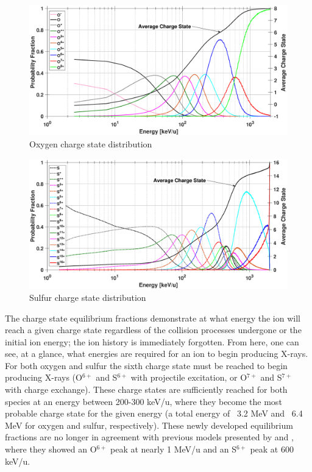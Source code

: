 \documentclass[draft]{agujournal2018}
\begin{document}
\begin{figure}[ht]
    \centering
    \includegraphics[width=\textwidth]{Figures/CSDoxy.eps}
    \caption{Oxygen charge state distribution}
    \label{fig:CSDoxy}
\end{figure}

\begin{figure}[ht]
    \centering
    \includegraphics[width=\textwidth]{Figures/CSDsul.eps}
    \caption{Sulfur charge state distribution}
    \label{fig:CSDsul}
\end{figure}

The charge state equilibrium fractions demonstrate at what energy the ion will reach a given charge state regardless of the collision processes undergone or the initial ion energy; the ion history is immediately forgotten.
From here, one can see, at a glance, what energies are required for an ion to begin producing X-rays.
For both oxygen and sulfur the sixth charge state must be reached to begin producing X-rays (O$^{6+}$ and S$^{6+}$ with projectile excitation, or O$^{7+}$ and S$^{7+}$ with charge exchange).
These charge states are sufficiently reached for both species at an energy between 200-300 keV/u, where they become the most probable charge state for the given energy (a total energy of ~3.2 MeV and ~6.4 MeV for oxygen and sulfur, respectively).
These newly developed equilibrium fractions are no longer in agreement with previous models presented by \citet{ozak2010} and \citet{houston2018}, where they showed an O$^{6+}$ peak at nearly 1 MeV/u and an S$^{6+}$ peak at 600 keV/u.
\end{document}
